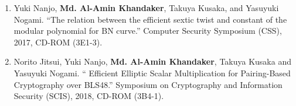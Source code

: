\begin{itemize}
\begin{enumerate}
	\item Yuki Nanjo,  \textbf{Md. Al-Amin Khandaker}, Takuya Kusaka, and  Yasuyuki Nogami. ``The relation between the efficient sextic twist and constant of the modular polynomial for BN curve.'' Computer Security Symposium  (CSS),  2017, CD-ROM (3E1-3). 
	
	\item  Norito Jitsui, Yuki Nanjo, \textbf{Md. Al-Amin Khandaker}, Takuya Kusaka and Yasuyuki Nogami. ``	Efficient Elliptic Scalar Multiplication for Pairing-Based Cryptography over BLS48.'' Symposium on Cryptography and Information Security (SCIS),  2018, CD-ROM (3B4-1).  
	
		
\end{enumerate}
\normalsize
\end{itemize}

